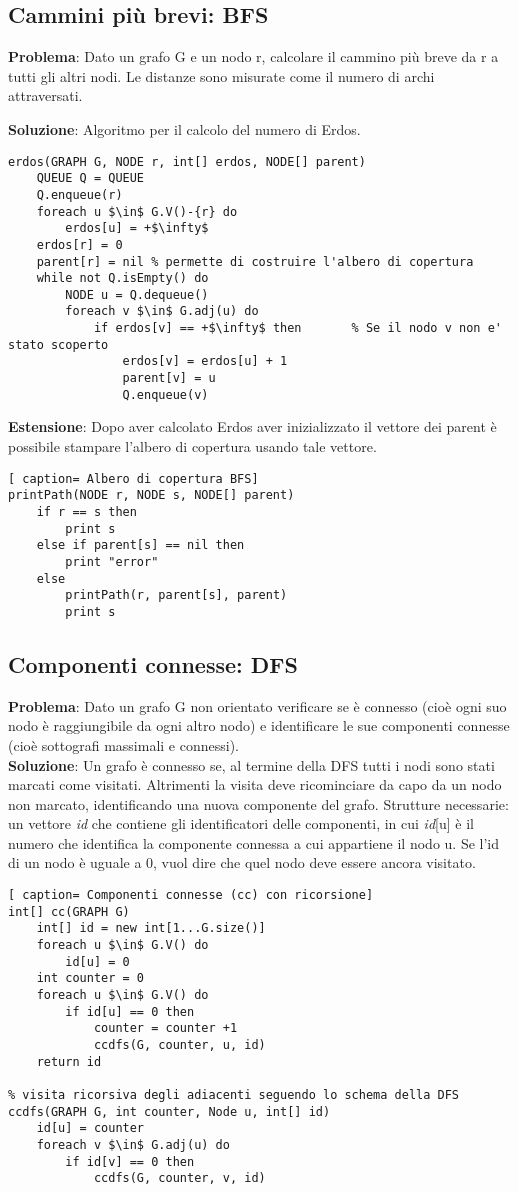 \documentclass[../cheatSheetAlgoritmi.tex]{subfiles}
\begin{document}
\subsection{Cammini più brevi: BFS}
\textbf{Problema}: Dato un grafo G e un nodo r, calcolare il cammino più breve da r a tutti gli altri nodi. Le distanze sono misurate come il numero di archi attraversati.

\textbf{Soluzione}: Algoritmo per il calcolo del numero di Erdos.

\begin{lstlisting}[caption= Erdos]
erdos(GRAPH G, NODE r, int[] erdos, NODE[] parent)
	QUEUE Q = QUEUE
	Q.enqueue(r)
	foreach u $\in$ G.V()-{r} do
		erdos[u] = +$\infty$
	erdos[r] = 0
	parent[r] = nil % permette di costruire l'albero di copertura
	while not Q.isEmpty() do
		NODE u = Q.dequeue()
		foreach v $\in$ G.adj(u) do
			if erdos[v] == +$\infty$ then		% Se il nodo v non e' stato scoperto
				erdos[v] = erdos[u] + 1
				parent[v] = u
				Q.enqueue(v)
\end{lstlisting}
\textbf{Estensione}: Dopo aver calcolato Erdos aver inizializzato il vettore dei parent è possibile stampare l'albero di copertura usando tale vettore.\
\begin{lstlisting}[ caption= Albero di copertura BFS]
printPath(NODE r, NODE s, NODE[] parent)
	if r == s then
		print s
	else if parent[s] == nil then
		print "error"
	else
		printPath(r, parent[s], parent)
		print s
\end{lstlisting}
\subsection{Componenti connesse: DFS}
\textbf{Problema}: Dato un grafo G non orientato verificare se è connesso (cioè  ogni suo nodo è raggiungibile da ogni altro nodo) e identificare le sue componenti connesse (cioè sottografi massimali e connessi).\\
\textbf{Soluzione}: Un grafo è connesso se, al termine della DFS tutti i nodi sono stati marcati come visitati. Altrimenti la visita deve ricominciare da capo da un nodo non marcato, identificando una nuova componente del grafo. Strutture necessarie: un vettore \textit{id} che contiene gli identificatori delle componenti, in cui \textit{id}[u] è il numero che identifica la componente connessa a cui appartiene il nodo u. Se l'id di un nodo è uguale a 0, vuol dire che quel nodo deve essere ancora visitato.\
\newpage
\begin{lstlisting}[ caption= Componenti connesse (cc) con ricorsione]
int[] cc(GRAPH G)
	int[] id = new int[1...G.size()]
	foreach u $\in$ G.V() do
		id[u] = 0
	int counter = 0
	foreach u $\in$ G.V() do
		if id[u] == 0 then
			counter = counter +1
			ccdfs(G, counter, u, id)
	return id

% visita ricorsiva degli adiacenti seguendo lo schema della DFS	
ccdfs(GRAPH G, int counter, Node u, int[] id)
	id[u] = counter
	foreach v $\in$ G.adj(u) do
		if id[v] == 0 then
			ccdfs(G, counter, v, id)
\end{lstlisting}
\end{document}
